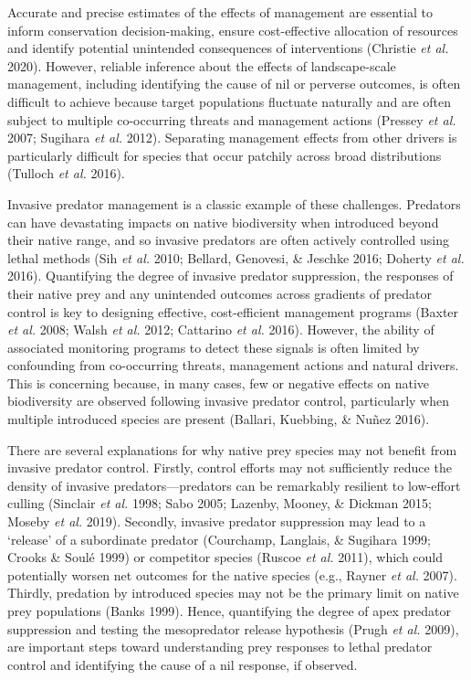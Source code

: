 \documentclass[]{elsarticle} %
\begin{document}
Accurate and precise estimates of the effects of management are essential to inform conservation decision-making, ensure cost-effective allocation of resources and identify potential unintended consequences of interventions (Christie \emph{et al.} 2020). However, reliable inference about the effects of landscape-scale management, including identifying the cause of nil or perverse outcomes, is often difficult to achieve because target populations fluctuate naturally and are often subject to multiple co-occurring threats and management actions (Pressey \emph{et al.} 2007; Sugihara \emph{et al.} 2012). Separating management effects from other drivers is particularly difficult for species that occur patchily across broad distributions (Tulloch \emph{et al.} 2016).

Invasive predator management is a classic example of these challenges. Predators can have devastating impacts on native biodiversity when introduced beyond their native range, and so invasive predators are often actively controlled using lethal methods (Sih \emph{et al.} 2010; Bellard, Genovesi, \& Jeschke 2016; Doherty \emph{et al.} 2016). Quantifying the degree of invasive predator suppression, the responses of their native prey and any unintended outcomes across gradients of predator control is key to designing effective, cost-efficient management programs (Baxter \emph{et al.} 2008; Walsh \emph{et al.} 2012; Cattarino \emph{et al.} 2016). However, the ability of associated monitoring programs to detect these signals is often limited by confounding from co-occurring threats, management actions and natural drivers. This is concerning because, in many cases, few or negative effects on native biodiversity are observed following invasive predator control, particularly when multiple introduced species are present (Ballari, Kuebbing, \& Nuñez 2016).

There are several explanations for why native prey species may not benefit from invasive predator control. Firstly, control efforts may not sufficiently reduce the density of invasive predators---predators can be remarkably resilient to low-effort culling (Sinclair \emph{et al.} 1998; Sabo 2005; Lazenby, Mooney, \& Dickman 2015; Moseby \emph{et al.} 2019). Secondly, invasive predator suppression may lead to a `release' of a subordinate predator (Courchamp, Langlais, \& Sugihara 1999; Crooks \& Soulé 1999) or competitor species (Ruscoe \emph{et al.} 2011), which could potentially worsen net outcomes for the native species (e.g., Rayner \emph{et al.} 2007). Thirdly, predation by introduced species may not be the primary limit on native prey populations (Banks 1999). Hence, quantifying the degree of apex predator suppression and testing the mesopredator release hypothesis (Prugh \emph{et al.} 2009), are important steps toward understanding prey responses to lethal predator control and identifying the cause of a nil response, if observed.
\end{document}
